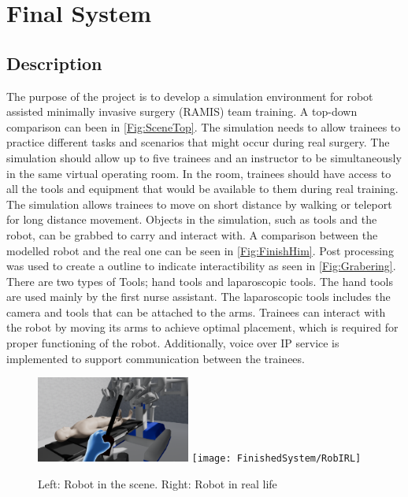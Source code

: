 \chapter{Final System}
\section*{Description} 
The purpose of the project is to develop a simulation environment for robot assisted minimally invasive surgery (RAMIS) team training. A top-down comparison can been in \autoref{Fig:SceneTop}. The simulation needs to allow trainees to practice different tasks and scenarios that might occur during real surgery.
The simulation should allow up to five trainees and an instructor to be simultaneously in the same virtual operating room. In the room, trainees should have access to all the tools and equipment that would be available to them during real training.
The simulation allows trainees to move on short distance by walking or teleport for long distance movement. Objects in the simulation, such as tools and the robot, can be grabbed to carry and interact with. A comparison between the modelled robot and the real one can be seen in \autoref{Fig:FinishHim}. Post processing was used to create a outline to indicate interactibility as seen in \autoref{Fig:Grabering}. There are two types of Tools; hand tools and laparoscopic tools. The hand tools are used mainly by the first nurse assistant. The laparoscopic tools includes the camera and tools that can be attached to the arms. Trainees can interact with the robot by moving its arms to achieve optimal placement, which is required for proper functioning of the robot. Additionally, voice over IP service is implemented to support communication between the trainees. 


\begin{figure}
\centering
\includegraphics[width=0.45\textwidth]{FinishedSystem/RobInGame}
\texttt{[image: FinishedSystem/RobIRL]}
\caption{Left: Robot in the scene. Right: Robot in real life}
\label{Fig:FinishHim}
\end{figure}


